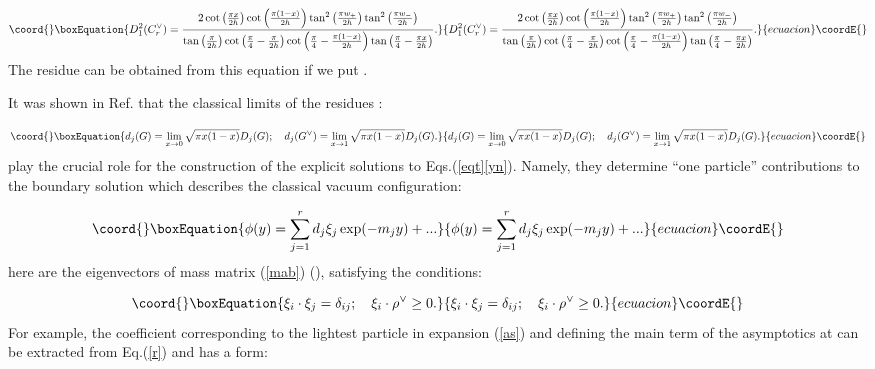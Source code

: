 \documentclass[a4paper,12pt,titlepage,final]{article}
\begin{document}
\begin{equation}\coord{}\boxEquation{
D_{1}^{2}(C_{r}^{\vee })=\frac{2\cot \left( \frac{\pi x}{2h}\right) \cot
\left( \frac{\pi (1-x)}{2h}\right) \tan ^{2}\left( \frac{\pi w_{+}}{2h}
\right) \tan ^{2}\left( \frac{\pi w_{-}}{2h}\right) }{\tan \left( \frac{\pi
}{2h}\right) \cot \left( \frac{\pi }{4}-\frac{\pi }{2h}\right) \cot \left(
\frac{\pi }{4}-\frac{\pi (1-x)}{2h}\right) \tan \left( \frac{\pi }{4}-
\frac{\pi x}{2h}\right) }.  \label{r}
}{
D_{1}^{2}(C_{r}^{\vee })=\frac{2\cot \left( \frac{\pi x}{2h}\right) \cot
\left( \frac{\pi (1-x)}{2h}\right) \tan ^{2}\left( \frac{\pi w_{+}}{2h}
\right) \tan ^{2}\left( \frac{\pi w_{-}}{2h}\right) }{\tan \left( \frac{\pi
}{2h}\right) \cot \left( \frac{\pi }{4}-\frac{\pi }{2h}\right) \cot \left(
\frac{\pi }{4}-\frac{\pi (1-x)}{2h}\right) \tan \left( \frac{\pi }{4}-
\frac{\pi x}{2h}\right) }.  }{ecuacion}\coordE{}\end{equation}
The residue \coordHE{} can be obtained from this equation if we put
\coordHE{}.

It was shown in Ref.\cite{FO} that the classical limits of the residues
\coordHE{}:

\begin{equation}\coord{}\boxEquation{
d_{j}(G)=\lim_{x\rightarrow 0}\sqrt{\pi x(1-x)}D_{j}(G);\quad d_{j}(G^{\vee
})=\lim_{x\rightarrow 1}\sqrt{\pi x(1-x)}D_{j}(G).  \label{dgg}
}{
d_{j}(G)=\lim_{x\rightarrow 0}\sqrt{\pi x(1-x)}D_{j}(G);\quad d_{j}(G^{\vee
})=\lim_{x\rightarrow 1}\sqrt{\pi x(1-x)}D_{j}(G).  }{ecuacion}\coordE{}\end{equation}
play the crucial role for the construction of the explicit solutions
to Eqs.(\ref{eqt}\ref{yn}).
Namely, they determine ``one particle'' contributions to
the boundary solution \coordHE{} which describes the classical vacuum
configuration:

\begin{equation}\coord{}\boxEquation{
\phi (y)=\sum_{j=1}^{r}d_{j}\xi _{j}\exp (-m_{j}y)+...  \label{as}
}{
\phi (y)=\sum_{j=1}^{r}d_{j}\xi _{j}\exp (-m_{j}y)+...  }{ecuacion}\coordE{}\end{equation}
here \coordHE{} are the eigenvectors of mass matrix (\ref{mab}) (\coordHE{}), satisfying the conditions:

\begin{equation}\coord{}\boxEquation{
\xi _{i}\cdot \xi _{j}=\delta _{ij};\quad \xi _{i}\cdot \rho ^{\vee }\geq 0.
\label{mv}
}{
\xi _{i}\cdot \xi _{j}=\delta _{ij};\quad \xi _{i}\cdot \rho ^{\vee }\geq 0.
}{ecuacion}\coordE{}\end{equation}
For example, the coefficient \coordHE{} corresponding to the lightest particle
\coordHE{} in expansion (\ref{as}) and defining the main term of the
asymptotics
at \coordHE{} can be extracted from Eq.(\ref{r}) and has a form:
\end{document}
